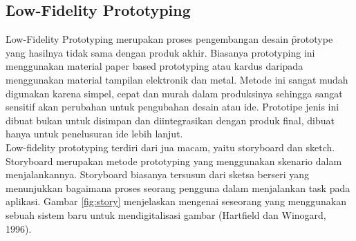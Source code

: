 \subsection{\f{Low-Fidelity Prototyping}}
\f{Low-Fidelity Prototyping} merupakan proses pengembangan desain \f{prototype} yang hasilnya tidak sama dengan produk akhir. Biasanya prototyping ini menggunakan material paper based prototyping atau kardus daripada menggunakan material tampilan elektronik dan metal. Metode ini sangat mudah digunakan karena simpel, cepat dan murah dalam produksinya sehingga sangat sensitif akan perubahan untuk pengubahan desain atau ide. \f{Prototipe} jenis ini dibuat bukan untuk disimpan dan diintegrasikan dengan produk final, dibuat hanya untuk penelusuran ide lebih lanjut. 
\newline\\
\f{Low-fidelity prototyping} terdiri dari jua macam, yaitu storyboard dan sketch. Storyboard merupakan metode prototyping yang menggunakan skenario dalam menjalankannya. Storyboard biasanya tersusun dari sketsa berseri yang menunjukkan bagaimana proses seorang pengguna dalam menjalankan task pada aplikasi. Gambar \ref{fig:story} menjelaskan mengenai seseorang yang menggunakan sebuah sistem baru untuk mendigitalisasi gambar (Hartfield dan Winogard, 1996).


